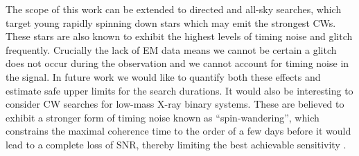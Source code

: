 \documentclass[../full_thesis/full_thesis.tex]{subfiles}
\begin{document}
The scope of this work can be extended to  directed and all-sky searches, which
target young rapidly spinning down stars which may emit the strongest CWs.
These stars are also known to exhibit the highest levels of timing noise and
glitch frequently. Crucially the lack of EM data means we cannot be certain a
glitch does not occur during the observation and we cannot account for timing
noise in the signal.  In future work we would like to quantify both these
effects and estimate safe upper limits for the search durations.
It would also be interesting to consider CW searches for low-mass X-ray binary systems.
These are believed to exhibit a stronger form of timing noise known as
``spin-wandering'', which constrains the maximal coherence time to
the order of a few days before it would lead to a complete loss of
SNR, thereby limiting the best achievable sensitivity
\cite{2014arXiv1412.0605T,2015arXiv150200914L,ScoX1:MDC1}.

\biblio
\end{document}
